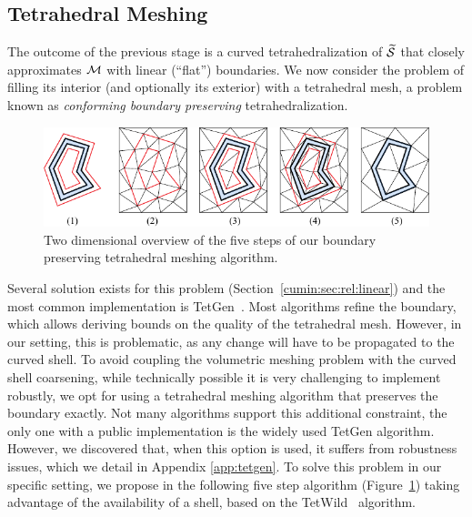 \subsection{Tetrahedral Meshing}\label{cumin:sec:tets}

The outcome of the previous stage is a curved tetrahedralization of $\widetilde{\mathcal{S}}$ that closely approximates $\mathcal{M}$ with linear (``flat'') boundaries. We now consider the problem of filling its interior (and optionally its exterior) with a tetrahedral mesh, a problem known as  \emph{conforming boundary preserving} tetrahedralization. 


\begin{figure}
    \centering
    \includegraphics[width=\linewidth]{curve_meshing_in_shell_tex/figs/illustrations/conforming-overview.pdf}
    \caption{Two dimensional overview of the five steps of our boundary preserving tetrahedral meshing algorithm.}
    \label{bichon:fig:conforming-overview}
\end{figure}

Several solution exists for this problem (Section~\ref{cumin:sec:rel:linear}) and the most common implementation is TetGen~\cite{tetgen}. Most algorithms refine the boundary, which allows {deriving} bounds on the quality of the tetrahedral mesh. However, in our setting, this is problematic, as any change will have to be propagated to the curved shell. To avoid coupling the volumetric meshing problem with the curved shell coarsening, while technically possible it is very challenging to implement robustly, we opt for using a tetrahedral meshing algorithm that preserves the boundary exactly. Not many algorithms support this additional constraint, the only one with a public implementation is the widely used TetGen algorithm. However, we discovered that, when this option is used, it suffers from robustness issues, which we detail in Appendix \ref{app:tetgen}.
%
To solve this problem in our specific setting, we propose in the following five step algorithm (Figure~\ref{bichon:fig:conforming-overview}) taking advantage of the availability of a shell, based on the  TetWild~\cite{hu2018tetrahedral} algorithm.

